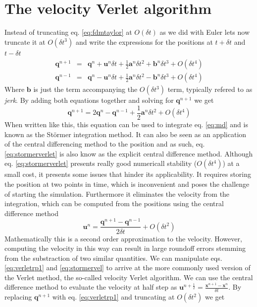 \documentclass[ twoside,openright,titlepage,numbers=noenddot,%
headinclude,footinclude,cleardoublepage=empty,abstract=on,
BCOR=5mm,paper=a4,fontsize=11pt, dvipsnames
]{scrreprt}
\renewcommand{\vec}[1]{\bm{#1}}
\newcommand{\dt}{\delta t}
\newcommand{\half}{\frac{1}{2}}
\newcommand{\ppos}{q}
\newcommand{\pvel}{u}
\begin{document}
\section{The velocity Verlet algorithm}\label{sec:velocityverlet}
Instead of truncating eq. \eqref{eq:fdmtaylor} at $O(\dt)$ as we did with Euler lets now truncate it at $O(\dt^3)$ and write the expressions for the positions at $t+\dt$ and $t-\dt$
\begin{eqnarray}
  \label{eq:verletrp1}
  \vec{\ppos}^{n+1} &=& \vec{\ppos}^n + \vec{\pvel}^n\dt + \half\vec{a}^n\dt^2 + \vec{b}^n\dt^3 + O(\dt^4)\\
  \vec{\ppos}^{n-1} &=& \vec{\ppos}^n - \vec{\pvel}^n\dt + \half\vec{a}^n\dt^2 - \vec{b}^n\dt^3 + O(\dt^4)
\end{eqnarray}
Where $\vec{b}$ is just the term accompanying the $O(\dt^3)$ term, typically refered to as \emph{jerk}.
By adding both equations together and solving for $\vec{\ppos}^{n+1}$ we get
\begin{equation}
  \label{eq:stormerverlet}
  \vec{\ppos}^{n+1} = 2\vec{\ppos}^n - \vec{\ppos}^{n-1} + \half\vec{a}^n\dt^2 + O(\dt^4)
\end{equation}
When written like this, this equation can be used to integrate eq. \eqref{eq:md} and is known as the Störmer integration method. It can also be seen as an application of the central differencing method to the position and as such, eq. \eqref{eq:stormerverlet} is also know as the explicit central difference method.
Although eq. \eqref{eq:stormerverlet} presents really good numericall stability ($O(\dt^4)$) at a small cost, it presents some issues that hinder its applicability.
It requires storing the position at two points in time, which is inconvenient and poses the challenge of starting the simulation.
Furthermore it eliminates the velocity from the integration, which can be computed from the positions using the central difference method
\begin{equation}
  \label{eq:stormervel}
  \vec{\pvel}^n = \frac{\vec{\ppos} ^{n+1} - \vec{\ppos}^{n-1}}{2\dt} + O(\dt^2)
\end{equation}
Mathematically this is a second order approximation to the velocity. However, computing the velocity in this way can result in large roundoff errors stemming from the substraction of two similar quantities.
We can manipulate eqs. \eqref{eq:verletrp1} and \eqref{eq:stormervel} to arrive at the more commonly used version of the Verlet method, the so-called velocity Verlet algorithm.
We can use the central difference method to evaluate the velocity at half step as $\vec{\pvel}^{n+\half} = \frac{\vec{x}^{n+1} - \vec{x}^n}{\dt}$. By replacing $\vec{\ppos}^{n+1}$ with eq. \eqref{eq:verletrp1} and truncating at $O(\dt^2)$ we get
\end{document}
